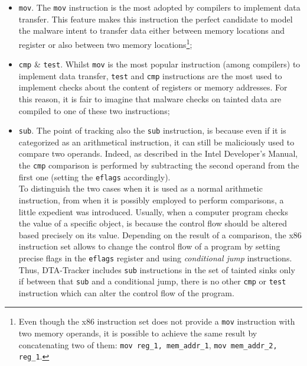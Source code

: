 \documentclass[LaM,binding=0.6cm]{sapthesis}
\begin{document}
\begin{itemize}
\item \texttt{mov}. The \texttt{mov} instruction is the most adopted by compilers to implement data transfer. This feature makes this instruction the perfect candidate to model the malware intent to transfer data either between memory locations and register or also between two memory locations\footnote{Even though the x$86$ instruction set does not provide a \texttt{mov} instruction with two memory operands, it is possible to achieve the same result by concatenating two of them: \texttt{mov reg\_1, mem\_addr\_1}, \texttt{mov mem\_addr\_2, reg\_1}.};
\item \texttt{cmp} \& \texttt{test}. Whilst \texttt{mov} is the most popular instruction (among compilers) to implement data transfer, \texttt{test} and \texttt{cmp} instructions are the most used to implement checks about the content of registers or memory addresses. For this reason, it is fair to imagine that malware checks on tainted data are compiled to one of these two instructions;
\item \texttt{sub}. The point of tracking also the \texttt{sub} instruction, is because even if it is categorized as an arithmetical instruction, it can still be maliciously used to compare two operands. Indeed, as described in the Intel Developer's Manual\cite{intel2018intel}, the \texttt{cmp} comparison is performed by subtracting the second operand from the first one (setting the \texttt{eflags} accordingly).\\
To distinguish the two cases when it is used as a normal arithmetic instruction, from when it is possibly employed to perform comparisons, a little expedient was introduced. Usually, when a computer program checks the value of a specific object, is because the control flow should be altered based precisely on its value. Depending on the result of a comparison, the x$86$ instruction set allows to change the control flow of a program by setting precise flags in the \texttt{eflags} register and using \textit{conditional jump} instructions. Thus, DTA-Tracker includes \texttt{sub} instructions in the set of tainted sinks only if between that \texttt{sub} and a conditional jump, there is no other \texttt{cmp} or \texttt{test} instruction which can alter the control flow of the program.
\end{itemize}
\end{document}
